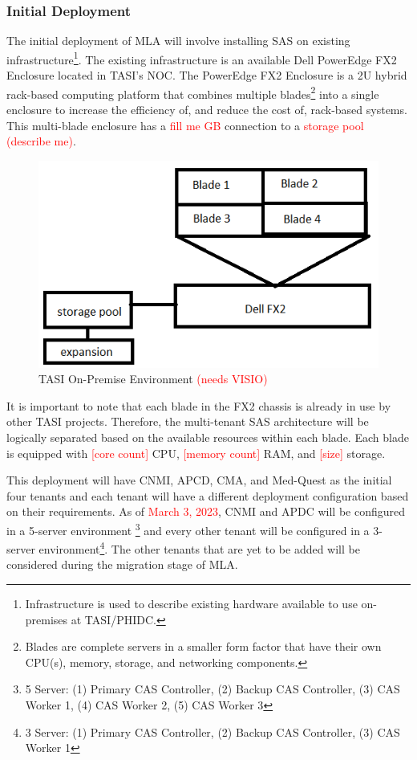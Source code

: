 \subsubsection{Initial Deployment}
The initial deployment of MLA will involve installing SAS on existing infrastructure\footnote{Infrastructure is used to describe existing hardware available to use on-premises at TASI/PHIDC.}. The existing infrastructure is  an available Dell PowerEdge FX2 Enclosure located in TASI's NOC. The PowerEdge FX2 Enclosure is a 2U hybrid rack-based computing platform that combines multiple blades\footnote{Blades are complete servers in a smaller form factor that have their own CPU(s), memory, storage, and networking components.} into a single enclosure to increase the efficiency of, and reduce the cost of, rack-based systems. This multi-blade enclosure has a \textcolor{red}{fill me GB} connection to a \textcolor{red}{storage pool (describe me)}.

\begin{figure}[H]
    \centering
    \includegraphics[scale = 0.5]{images/currentENV.png}
    \caption{TASI On-Premise Environment \textcolor{red}{(needs VISIO)} }
    \label{Current ENV}
\end{figure}

It is important to note that each blade in the FX2 chassis is already in use by other TASI projects. Therefore, the multi-tenant SAS architecture will be logically separated based on the available resources within each blade. Each blade is equipped with \textcolor{red}{[core count]} CPU, \textcolor{red}{[memory count]} RAM, and \textcolor{red}{[size]} storage. 

This deployment will have CNMI, APCD, CMA, and Med-Quest as the initial four tenants and each tenant will have a different deployment configuration based on their requirements. As of \textcolor{red}{March 3, 2023}, CNMI and APDC will be configured in a 5-server environment \footnote{5 Server: (1) Primary CAS Controller, (2) Backup CAS Controller, (3) CAS Worker 1, (4) CAS Worker 2, (5) CAS Worker 3} and every other tenant will be configured in a 3-server environment\footnote{3 Server: (1) Primary CAS Controller, (2) Backup CAS Controller, (3) CAS Worker 1}. The other tenants that are yet to be added will be considered during the migration stage of MLA. 

